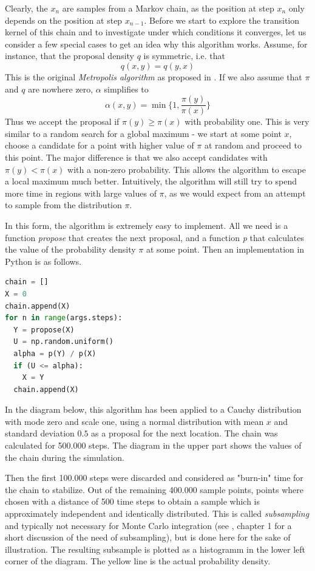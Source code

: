 \documentclass[a4paper, draft]{article}
\theoremstyle{own}
\theoremstyle{remark}
\begin{document}
Clearly, the $x_n$ are samples from a Markov chain, as the position at step $x_n$ only depends on the position at step $x_{n-1}$. Before we start to explore the transition kernel of this chain and to investigate under which conditions it converges, let us consider a few special cases to get an idea why this algorithm works. Assume, for instance, that the proposal density $q$ is symmetric, i.e. that 
$$
q(x,y) = q(y, x)
$$
This is the original {\em Metropolis algorithm} as proposed in \cite{Metropolis1953}. If we also assume that $\pi$ and $q$ are nowhere zero,  $\alpha$ simplifies to
$$
\alpha(x,y) = 
\min \{ 1, \frac{\pi(y)}{\pi(x)} \}
$$
Thus we accept the proposal if $\pi(y) \geq \pi(x)$ with probability one. This is very similar to a random search for a global maximum - we start at some point $x$, choose a candidate for a point with higher value of $\pi$ at random and proceed to this point. The major difference is that we also accept candidates with $\pi(y) < \pi(x)$ with a non-zero probability. This allows the algorithm to escape a local maximum much better. Intuitively, the algorithm will still try to spend more time in regions with large values of $\pi$, as we would expect from an attempt to sample from the distribution $\pi$. 

In this form, the algorithm is extremely easy to implement. All we need is a function {\it propose} that creates the next proposal, and a function {\it p} that calculates the value of the probability density $\pi$ at some point. Then an implementation in Python is as follows.

\begin{lstlisting}[frame=single,language=Python,caption=Metropolis algorithm in Python]
chain = []
X = 0
chain.append(X)
for n in range(args.steps):
  Y = propose(X)
  U = np.random.uniform()
  alpha = p(Y) / p(X)
  if (U <= alpha):
    X = Y
  chain.append(X)
\end{lstlisting}

In the diagram below, this algorithm has been applied to a Cauchy distribution with mode zero
and scale one, using a normal distribution with mean $x$ and standard deviation $0.5$ as a proposal for the next location. The chain was calculated for 500.000 steps. The diagram in the upper part shows the values of the chain during the simulation. 

Then the first 100.000 steps were discarded and considered as "burn-in" time for the chain to stabilize. Out of the remaining 400.000 sample points, points where chosen with a distance of 500 time steps to obtain a sample which is approximately independent and identically distributed.
This is called {\em subsampling} and typically not necessary for Monte Carlo integration (see \cite{MCMCHandbook}, chapter 1 for a short discussion of the need of subsampling), but is done here for the sake of illustration. The resulting subsample is plotted as a histogramm in the lower left corner of the diagram. The yellow line is the actual probability density.  
\end{document}
